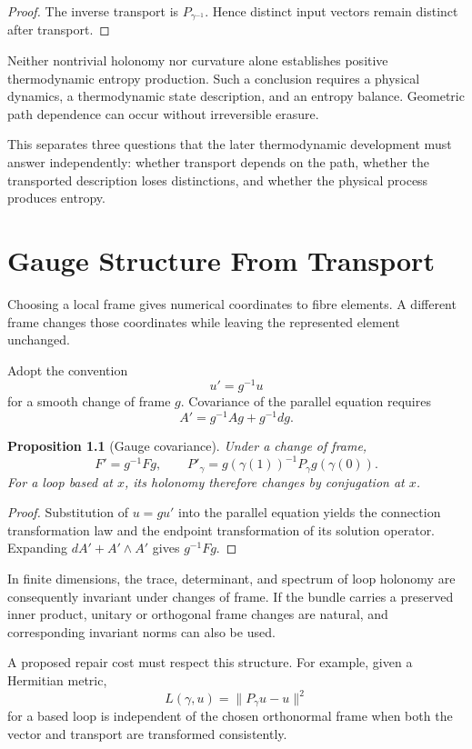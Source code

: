 \documentclass[11pt,oneside]{book}
\newtheorem{proposition}[theorem]{Proposition}
\theoremstyle{definition}
\theoremstyle{remark}
\begin{document}
\begin{proof}
The inverse transport is $P_{\gamma^{-1}}$. Hence distinct input
vectors remain distinct after transport.
\end{proof}

Neither nontrivial holonomy nor curvature alone establishes
positive thermodynamic entropy production. Such a conclusion
requires a physical dynamics, a thermodynamic state description,
and an entropy balance. Geometric path dependence can occur
without irreversible erasure.

This separates three questions that the later thermodynamic
development must answer independently: whether transport depends
on the path, whether the transported description loses
distinctions, and whether the physical process produces entropy.


\chapter{Gauge Structure From Transport}

Choosing a local frame gives numerical coordinates to fibre
elements. A different frame changes those coordinates while
leaving the represented element unchanged.

Adopt the convention
\[
u'=g^{-1}u
\]
for a smooth change of frame $g$. Covariance of the parallel
equation requires
\[
A'=g^{-1}Ag+g^{-1}dg.
\]

\begin{proposition}[Gauge covariance]
Under a change of frame,
\[
F'=g^{-1}Fg,
\qquad
P'_\gamma
=
g(\gamma(1))^{-1}P_\gamma g(\gamma(0)).
\]
For a loop based at $x$, its holonomy therefore changes by
conjugation at $x$.
\end{proposition}

\begin{proof}
Substitution of $u=gu'$ into the parallel equation yields the
connection transformation law and the endpoint transformation
of its solution operator. Expanding
$dA'+A'\wedge A'$ gives $g^{-1}Fg$.
\end{proof}

In finite dimensions, the trace, determinant, and spectrum of
loop holonomy are consequently invariant under changes of frame.
If the bundle carries a preserved inner product, unitary or
orthogonal frame changes are natural, and corresponding invariant
norms can also be used.

A proposed repair cost must respect this structure. For example,
given a Hermitian metric,
\[
L(\gamma,u)=\|P_\gamma u-u\|^2
\]
for a based loop is independent of the chosen orthonormal frame
when both the vector and transport are transformed consistently.
\end{document}
